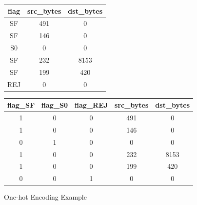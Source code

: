 \begin{figure}[H]
\begin{adjustbox}{width=1.0\textwidth,center}
\begin{tabular}{ccc}
\hline
flag&src\_bytes&dst\_bytes\\
\hline
SF&491&0\\
SF&146&0\\
S0&0&0\\
SF&232&8153\\
SF&199&420\\
REJ&0&0\\
\hline
\end{tabular}
\quad
\longrightarrow
\quad
\begin{tabular}{ccccc}
\hline
flag\_SF&flag\_S0&flag\_REJ&src\_bytes&dst\_bytes\\
\hline
1&0&0&491&0\\
1&0&0&146&0\\
0&1&0&0&0\\
1&0&0&232&8153\\
1&0&0&199&420\\
0&0&1&0&0\\
\hline
\end{tabular}
\end{adjustbox}
\caption{One-hot Encoding Example}
\label{ohe}
\end{figure}


